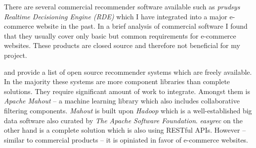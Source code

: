 There are several commercial recommender software available such as \emph{prudsys Realtime Decisioning Engine (RDE)} which I have integrated into a major e-commerce website in the past. In a brief analysis of commercial software I found that they usually cover only basic but common requirements for e-commerce websites. These products are closed source and therefore not beneficial for my project. 

\citet{hahsler11} and \citet{rack07} provide a list of open source recommender systems which are freely available. In the majority these systems are more component libraries than complete solutions. They require significant amount of work to integrate. Amongst them is \emph{Apache Mahout} -- a machine learning library which also includes collaborative filtering components. \emph{Mahout} is built upon \emph{Hadoop} which is a well-established big data software also curated by \emph{The Apache Software Foundation}. \emph{easyrec} on the other hand is a complete solution which is also using RESTful APIs. However -- similar to commercial products -- it is opiniated in favor of e-commerce websites.